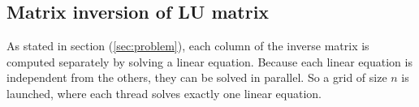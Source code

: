 \subsection*{Matrix inversion of LU matrix}
As stated in section (\ref{sec:problem}), each column of the inverse matrix is computed separately by solving a linear equation. Because each linear equation is independent from the others, they can be solved in parallel. So a grid of size $n$ is launched, where each thread solves exactly one linear equation.  
